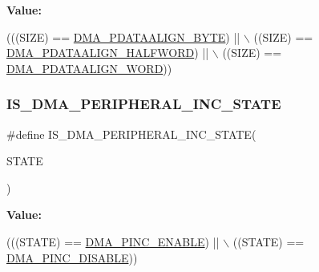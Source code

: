 {\bfseries Value\+:}
\begin{DoxyCode}
(((SIZE) == \mbox{\hyperlink{group___d_m_a___peripheral__data__size_ga55b8c8f5ec95f10d26d6c5b1c9136730}{DMA\_PDATAALIGN\_BYTE}})     || \(\backslash\)
                                           ((SIZE) == \mbox{\hyperlink{group___d_m_a___peripheral__data__size_gac08bfd907442dba5358830b247135bcc}{DMA\_PDATAALIGN\_HALFWORD}}) || \(\backslash\)
                                           ((SIZE) == \mbox{\hyperlink{group___d_m_a___peripheral__data__size_gaad50e97cbc4a726660db9c3f42ac93b0}{DMA\_PDATAALIGN\_WORD}}))
\end{DoxyCode}
\mbox{\label{group___d_m_a___private___macros_ga28762105b3f567c16ba79a47e68ff0fa}} 
\subsubsection{\texorpdfstring{I\+S\+\_\+\+D\+M\+A\+\_\+\+P\+E\+R\+I\+P\+H\+E\+R\+A\+L\+\_\+\+I\+N\+C\+\_\+\+S\+T\+A\+TE}{IS\_DMA\_PERIPHERAL\_INC\_STATE}}
{\footnotesize\ttfamily \#define I\+S\+\_\+\+D\+M\+A\+\_\+\+P\+E\+R\+I\+P\+H\+E\+R\+A\+L\+\_\+\+I\+N\+C\+\_\+\+S\+T\+A\+TE(\begin{DoxyParamCaption}\item[{}]{S\+T\+A\+TE }\end{DoxyParamCaption})}

{\bfseries Value\+:}
\begin{DoxyCode}
(((STATE) == \mbox{\hyperlink{group___d_m_a___peripheral__incremented__mode_gab6d84e5805302516d26c06fb4497a346}{DMA\_PINC\_ENABLE}}) || \(\backslash\)
                                            ((STATE) == \mbox{\hyperlink{group___d_m_a___peripheral__incremented__mode_ga63e2aff2973d1a8f01d5d7b6e4894f39}{DMA\_PINC\_DISABLE}}))
\end{DoxyCode}
\mbox{\label{group___d_m_a___private___macros_gaa1cae2ab458948511596467c87cd02b6}} 
